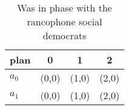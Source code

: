 \documentclass[a4paper]{article}
\begin{document}
\begin{table}
\begin{adjustbox}{width=0.6\columnwidth}
\begin{tabular}{|l|l|l|l|}
\hline
\textbf{plan} & \multicolumn{1}{c|}{\textbf{0}} & \multicolumn{1}{c|}{\textbf{1}} & \multicolumn{1}{c|}{\textbf{2}} \\ \hline
\textbf{$a_0$}  & (0,0) & (1,0) & (2,0) \\ \hline
\textbf{$a_1$}  & (0,0) & (1,0) & (2,0) \\ \hline
\end{tabular}
\end{adjustbox}
\caption{Was in phase with the rancophone social democrats
}
\end{table}
\end{document}
